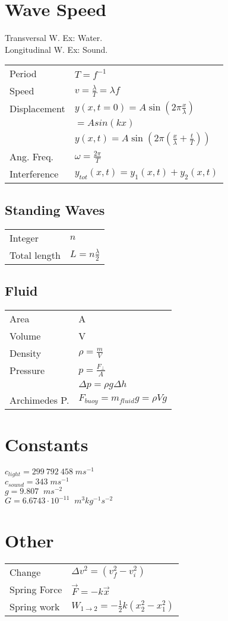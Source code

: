 \documentclass[5pt]{article}
\begin{document}
\begin{multicols}{3}
\section{Wave Speed}
Transversal W. Ex: Water.\\
Longitudinal W. Ex: Sound.\\
\begin{tabular}{ll}
Period & $T=f^{-1}$\\
Speed & $v=\frac{\lambda}{T}=\lambda f$\\
Displacement & $y(x, t=0)=A\sin(2\pi\frac{x}{\lambda})$\\
 & $=Asin(kx)$\\
& $y(x,t)=A\sin(2\pi(\frac{x}{\lambda}+\frac{t}{T}))$\\
Ang. Freq. & $\omega=\frac{2\pi}{T}$\\
Interference & $y_{tot}(x,t)=y_1(x,t)+y_2(x,t)$\\
\end{tabular}

\subsection{Standing Waves}
\begin{tabular}{ll}
Integer & $n$\\
Total length & $L=n\frac{\lambda}{2}$\\
\end{tabular}

\subsection{Fluid}
\begin{tabular}{ll}
Area & A\\
Volume & V\\
Density & $\rho=\frac{m}{V}$\\
Pressure & $p=\frac{F_{\perp}}{A}$\\
& $\Delta p=\rho g\Delta h$\\
Archimedes P.& $F_{buoy}=m_{fluid}g=\rho Vg$\\
\end{tabular}

\section{Constants}
$c_{light}=299\:792\:458\;ms^{-1}$\\
$c_{sound}=343\;ms^{-1}$\\
$g=9.807\;\; ms^{-2}$\\
$G=6.6743\cdot 10^{-11}\;\; m^3 kg^{-1} s^{-2}$

\section{Other}
\begin{tabular}{ll}
Change  & $\Delta v^2=(v_f^2-v_i^2)$\\
Spring Force & $\vec F = -k\vec x$\\
Spring work & $W_{1\to 2}=-\frac{1}{2}k(x_2^2-x_1^2)$

\end{tabular}


\end{multicols}
\end{document}

